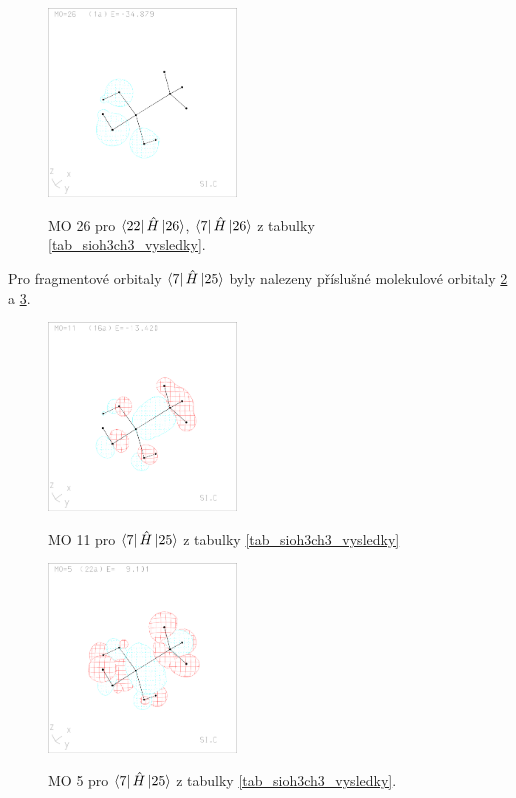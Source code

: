 \documentclass[
  digital, %
  table,   %
  lof,     %
  lot,     %
]{fithesis3}
\begin{document}
\begin{figure}[h]
\caption{MO 26 pro $\bra{22}{\hat{H}}\ket{26}$, $\bra{7}{\hat{H}}\ket{26}$ z tabulky \ref{tab_sioh3ch3_vysledky}.  }
  \center
  \includegraphics[width=5cm]{sioh3ch3_obrazky/s1_26.eps}
  \label{obr_sioh3ch3_MO_s1_26}
  \end{figure}
  
Pro fragmentové orbitaly $\bra{7}{\hat{H}}\ket{25}$ byly nalezeny příslušné molekulové orbitaly \ref{obr_sioh3ch3_MO_s2_11} a \ref{obr_sioh3ch3_MO_s2_5}.
  
  \begin{figure}[h]
\caption{MO 11 pro $\bra{7}{\hat{H}}\ket{25}$ z tabulky \ref{tab_sioh3ch3_vysledky}}
  \center
  \includegraphics[width=5cm]{sioh3ch3_obrazky/s2_11.eps}
  \label{obr_sioh3ch3_MO_s2_11}
  \end{figure}

\begin{figure}[h]
\caption{MO 5 pro $\bra{7}{\hat{H}}\ket{25}$ z tabulky \ref{tab_sioh3ch3_vysledky}.  }
  \center
  \includegraphics[width=5cm]{sioh3ch3_obrazky/s2_5.eps}
  \label{obr_sioh3ch3_MO_s2_5}
  \end{figure}
\end{document}
